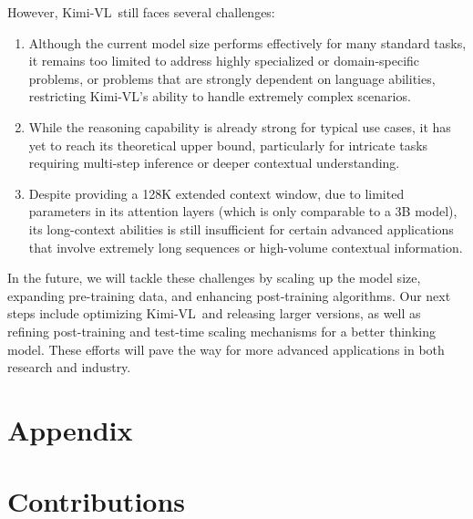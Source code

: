 \documentclass{article}
\newcommand{\ourname}{{Kimi-VL}}
\begin{document}
\noindent
However, \ourname~still faces several challenges:
\begin{enumerate}
    \item Although the current model size performs effectively for many standard tasks, it remains too limited to address highly specialized or domain-specific problems, or problems that are strongly dependent on language abilities, restricting \ourname's ability to handle extremely complex scenarios.
    \item While the reasoning capability is already strong for typical use cases, it has yet to reach its theoretical upper bound, particularly for intricate tasks requiring multi-step inference or deeper contextual understanding.
    \item Despite providing a 128K extended context window, due to limited parameters in its attention layers (which is only comparable to a 3B model), its long-context abilities is still insufficient for certain advanced applications that involve extremely long sequences or high-volume contextual information.
\end{enumerate}

\noindent

In the future, we will tackle these challenges by scaling up the model size, expanding pre-training data, and enhancing post-training algorithms. Our next steps include optimizing \ourname~and releasing larger versions, as well as refining post-training and test-time scaling mechanisms for a better thinking model. These efforts will pave the way for more advanced applications in both research and industry.




% 
\printbibliography[title={References}]

\newpage
\appendix

\section*{Appendix}

\section{Contributions}
\end{document}
